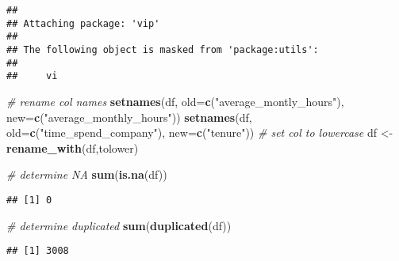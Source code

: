 \documentclass[
]{article}
\newenvironment{Shaded}{\begin{snugshade}}{\end{snugshade}}
\newcommand{\AttributeTok}[1]{\textcolor[rgb]{0.13,0.29,0.53}{#1}}
\newcommand{\CommentTok}[1]{\textcolor[rgb]{0.56,0.35,0.01}{\textit{#1}}}
\newcommand{\FunctionTok}[1]{\textcolor[rgb]{0.13,0.29,0.53}{\textbf{#1}}}
\newcommand{\NormalTok}[1]{#1}
\newcommand{\OtherTok}[1]{\textcolor[rgb]{0.56,0.35,0.01}{#1}}
\newcommand{\StringTok}[1]{\textcolor[rgb]{0.31,0.60,0.02}{#1}}
\begin{document}
\begin{verbatim}
## 
## Attaching package: 'vip'
## 
## The following object is masked from 'package:utils':
## 
##     vi
\end{verbatim}

\begin{Shaded}
\begin{Highlighting}[]
\CommentTok{\# rename col names}
\FunctionTok{setnames}\NormalTok{(df,  }\AttributeTok{old=}\FunctionTok{c}\NormalTok{(}\StringTok{"average\_montly\_hours"}\NormalTok{), }\AttributeTok{new=}\FunctionTok{c}\NormalTok{(}\StringTok{"average\_monthly\_hours"}\NormalTok{))}
\FunctionTok{setnames}\NormalTok{(df,  }\AttributeTok{old=}\FunctionTok{c}\NormalTok{(}\StringTok{"time\_spend\_company"}\NormalTok{), }\AttributeTok{new=}\FunctionTok{c}\NormalTok{(}\StringTok{"tenure"}\NormalTok{))}
\CommentTok{\# set col to lowercase}
\NormalTok{df }\OtherTok{\textless{}{-}}\FunctionTok{rename\_with}\NormalTok{(df,tolower)}
\end{Highlighting}
\end{Shaded}

\begin{Shaded}
\begin{Highlighting}[]
\CommentTok{\# determine NA }
\FunctionTok{sum}\NormalTok{(}\FunctionTok{is.na}\NormalTok{(df))}
\end{Highlighting}
\end{Shaded}

\begin{verbatim}
## [1] 0
\end{verbatim}

\begin{Shaded}
\begin{Highlighting}[]
\CommentTok{\# determine duplicated}
\FunctionTok{sum}\NormalTok{(}\FunctionTok{duplicated}\NormalTok{(df))}
\end{Highlighting}
\end{Shaded}

\begin{verbatim}
## [1] 3008
\end{verbatim}
\end{document}
